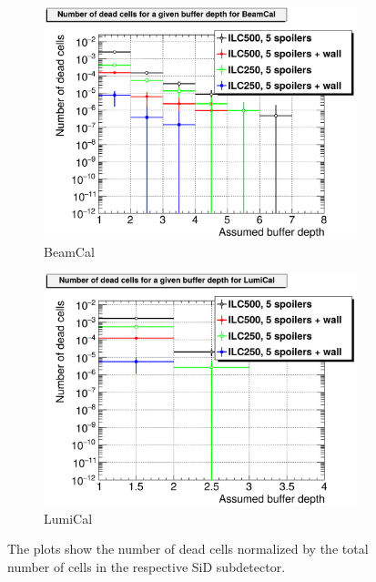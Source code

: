 \begin{figure}[htb]
\begin{subfigure}[b]{0.49\textwidth}
    \includegraphics[width=\textwidth]{Figures/BDS_muons/Occupancy_Comparison_All_layers_deadcells_BeamCal.png}
   \caption{BeamCal}
   \end{subfigure}
   \hfill
    \begin{subfigure}[b]{0.49\textwidth}
   \centering
    \includegraphics[width=\textwidth]{Figures/BDS_muons/Occupancy_Comparison_All_layers_deadcells_LumiCal.png}
   \caption{LumiCal}
   \end{subfigure}
   \caption[Occupancy from BDS muons of various SiD subdetectors]{The plots show the number of dead cells normalized by the total number of cells in the respective SiD subdetector.}
   \label{fig:BDS_Muons:occupancies}
 \end{figure}
 
